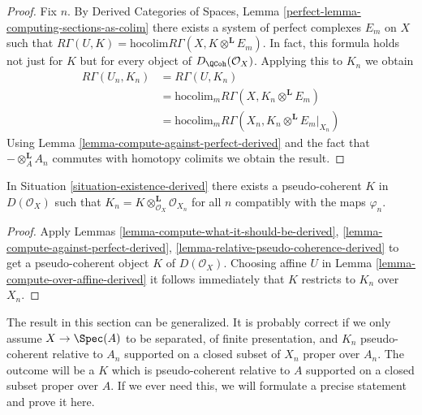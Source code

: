 \begin{proof}
Fix $n$. By Derived Categories of Spaces, Lemma
\ref{perfect-lemma-computing-sections-as-colim}
there exists a system of perfect complexes $E_m$
on $X$ such that
$R\Gamma(U, K) = \text{hocolim} R\Gamma(X, K \otimes^\mathbf{L} E_m)$.
In fact, this formula holds not just for $K$ but for every object of
$D_\QCoh(\mathcal{O}_X)$.
Applying this to $K_n$
we obtain
\begin{align*}
R\Gamma(U_n, K_n)
& =
R\Gamma(U, K_n) \\
& =
\text{hocolim}_m R\Gamma(X, K_n \otimes^\mathbf{L} E_m) \\
& =
\text{hocolim}_m R\Gamma(X_n, K_n \otimes^\mathbf{L} E_m|_{X_n})
\end{align*}
Using Lemma \ref{lemma-compute-against-perfect-derived}
and the fact that $- \otimes_A^\mathbf{L} A_n$
commutes with homotopy colimits we obtain the result.
\end{proof}

\begin{theorem}
\label{theorem-existence-derived}
In Situation \ref{situation-existence-derived}
there exists a pseudo-coherent $K$ in $D(\mathcal{O}_X)$
such that $K_n = K \otimes_{\mathcal{O}_X}^\mathbf{L} \mathcal{O}_{X_n}$
for all $n$ compatibly with the maps $\varphi_n$.
\end{theorem}

\begin{proof}
Apply Lemmas \ref{lemma-compute-what-it-should-be-derived},
\ref{lemma-compute-against-perfect-derived},
\ref{lemma-relative-pseudo-coherence-derived}
to get a pseudo-coherent object $K$ of $D(\mathcal{O}_X)$.
Choosing affine $U$ in Lemma
\ref{lemma-compute-over-affine-derived}
it follows immediately that $K$ restricts to $K_n$ over $X_n$.
\end{proof}

\begin{remark}
\label{remark-correct-generality}
The result in this section can be generalized. It is probably correct
if we only assume $X \to \Spec(A)$ to be separated, of finite presentation,
and $K_n$ pseudo-coherent relative to $A_n$ supported on a closed
subset of $X_n$ proper over $A_n$. The outcome will be a $K$ which
is pseudo-coherent relative to $A$ supported on a closed subset
proper over $A$. If we ever need this, we will
formulate a precise statement and prove it here.
\end{remark}


















